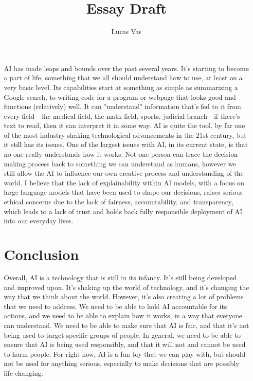 \documentclass[12pt]{article}
\title{Essay Draft}
\author{Lucas Vas}
\date{}
\begin{document}
    
    \thispagestyle{firstPage}
    \maketitle
    
    AI has made leaps and bounds over the past several years. It's starting to become a part of
    life, something that we all should understand how to use, at least on a very basic level. Its
    capabilities start at something as simple as summarizing a Google search, to writing code
    for a program or webpage that looks good and functions (relatively) well. It can "understand"
    information that's fed to it from every field - the medical field, the math field, sports, 
    judicial branch - if there's text to read, then it can interpret it in some way. AI is quite
    the tool, by far one of the most industry-shaking technological advancements in the 21st century,
    but it still has its issues. One of the largest issues with AI, in its current state, is that
    no one really understands how it works. Not one person can trace the decision-making process
    back to something we can understand as humans, however we still allow the AI to influence our
    own creative process and understanding of the world. I believe that the lack of explainability
    within AI models, with a focus on large language models that have been used to shape our
    decisions, raises serious ethical concerns due to the lack of fairness, accountability, and 
    transparency, which leads to a lack of trust and holds back fully responsible deployment of AI
    into our everyday lives.

    
    
    

    \section{Conclusion}
    Overall, AI is a technology that is still in its infancy. It's still being developed and
    improved upon. It's shaking up the world of technology, and it's changing the way that we think
    about the world. However, it's also creating a lot of problems that we need to address. We need
    to be able to hold AI accountable for its actions, and we need to be able to explain how it works,
    in a way that everyone can understand. We need to be able to make sure that AI is fair, and that
    it's not being used to target specific groups of people. In general, we need to be able to ensure
    that AI is being used responsibly, and that it will not and cannot be used to harm people. For
    right now, AI is a fun toy that we can play with, but should not be used for anything serious,
    especially to make decisions that are possibly life changing.
\end{document}

